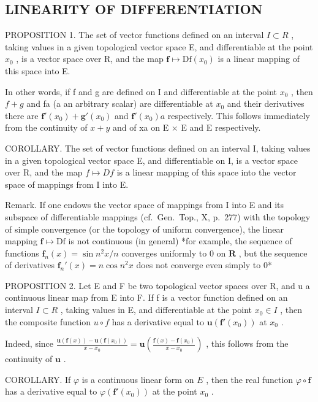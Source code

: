\subsection{LINEARITY OF DIFFERENTIATION}

PROPOSITION 1. The set of vector functions defined on an interval \(I \subset R\) , taking values in a given topological vector space E, and differentiable at the point \(x_{0}\) , is a vector space over R, and the map \(\mathbf{f} \mapsto \mathrm{Df}(x_{0})\) is a linear mapping of this space into E.

In other words, if f and g are defined on I and differentiable at the point \(x_{0}\) , then \(f + g\) and fa (a an arbitrary scalar) are differentiable at \(x_{0}\) and their derivatives there are \(\mathbf{f}'(x_{0}) + \mathbf{g}'(x_{0})\) and \(\mathbf{f}'(x_{0})a\) respectively. This follows immediately from the continuity of \(x + y\) and of xa on E × E and E respectively.

COROLLARY. The set of vector functions defined on an interval I, taking values in a given topological vector space E, and differentiable on I, is a vector space over R, and the map \(f \mapsto Df\) is a linear mapping of this space into the vector space of mappings from I into E.

Remark. If one endows the vector space of mappings from I into E and its subspace of differentiable mappings (cf.~Gen.~Top., X, p.~277) with the topology of simple convergence (or the topology of uniform convergence), the linear mapping \(\mathbf{f} \mapsto \mathrm{Df}\) is not continuous (in general) *for example, the sequence of functions \(\mathbf{f}_n(x) = \sin n^2 x / n\) converges uniformly to 0 on \(\mathbf{R}\) , but the sequence of derivatives \(\mathbf{f}_n'(x) = n\cos n^2 x\) does not converge even simply to \(0\)*

PROPOSITION 2. Let E and F be two topological vector spaces over R, and u a continuous linear map from E into F. If f is a vector function defined on an interval \(I \subset R\) , taking values in E, and differentiable at the point \(x_{0} \in I\) , then the composite function \(u \circ f\) has a derivative equal to \(\mathbf{u}(\mathbf{f}'(x_{0}))\) at \(x_{0}\) .

Indeed, since \(\frac{\mathbf{u}(\mathbf{f}(x)) - \mathbf{u}(\mathbf{f}(x_0))}{x - x_0} = \mathbf{u}\left(\frac{\mathbf{f}(x) - \mathbf{f}(x_0)}{x - x_0}\right)\) , this follows from the continuity of \(\mathbf{u}\) .

COROLLARY. If \(\varphi\) is a continuous linear form on \(E\) , then the real function \(\varphi \circ \mathbf{f}\) has a derivative equal to \(\varphi(\mathbf{f}'(x_0))\) at the point \(x_0\) .

